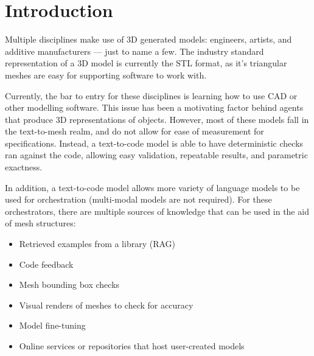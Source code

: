 \section{Introduction}
\label{sec:intro}


Multiple disciplines make use of 3D generated models: engineers, artists, and additive manufacturers --- just to name a few.
The industry standard representation of a 3D model is currently the STL format, as it's triangular meshes are easy for supporting software to work with.

Currently, the bar to entry for these disciplines is learning how to use CAD or other modelling software.
This issue has been a motivating factor behind agents that produce 3D representations of objects.
However, most of these models fall in the text-to-mesh realm, and do not allow for ease of measurement for specifications.
Instead, a text-to-code model is able to have deterministic checks ran against the code, allowing easy validation, repeatable results, and parametric exactness.


In addition, a text-to-code model allows more variety of language models to be used for orchestration (multi-modal models are not required).
For these orchestrators, there are multiple sources of knowledge that can be used in the aid of mesh structures:

\begin{itemize}
    \item Retrieved examples from a library (RAG)
    \item Code feedback
    \item Mesh bounding box checks
    \item Visual renders of meshes to check for accuracy
    \item Model fine-tuning
    \item Online services or repositories that host user-created models
\end{itemize}

